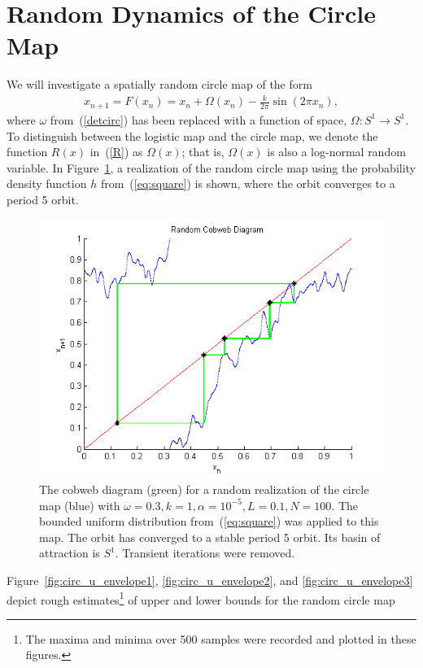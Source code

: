 \section{Random Dynamics of the Circle Map}
We will investigate a spatially random circle map of the form
\begin{align}\label{randcirc}
x_{n+1}= F(x_n) =  x_n + \Omega(x_n) - \frac{k}{2\pi}\sin(2\pi x_n),
\end{align}
where $\omega$ from~(\ref{detcirc}) has been replaced with a function
of space, $\Omega:S^1\to S^1$. To distinguish between the logistic map
and the circle map, we denote the function $R(x)$ in~(\ref{R}) as
$\Omega(x)$; that is, $\Omega(x)$ is also a log-normal random
variable. In Figure~\ref{fig:rcircstable}, a realization of the
random circle map using the probability density function $h$
from~(\ref{eq:square}) is shown, where the orbit converges to a period 5 orbit. 
\begin{figure}[!h]
\caption[Random circle map, stable orbit under the Uniform distribution]{The cobweb
  diagram (green) for a random realization of the circle map (blue) with $\omega =
  0.3, k=1, \alpha = 10^{-5},L=0.1, N=100$. The bounded uniform distribution
  from~(\ref{eq:square}) was applied to this map. The orbit
  has converged to a stable period 5 orbit. Its basin of attraction is
  $S^1$. Transient iterations were removed.}\label{fig:rcircstable}
	\begin{center}
		\includegraphics[scale=0.7]{figs/randcirc_cobweb.png}
	\end{center}
\end{figure}
Figure~\ref{fig:circ_u_envelope1}, \ref{fig:circ_u_envelope2}, and \ref{fig:circ_u_envelope3} depict rough estimates\footnote{The
  maxima and minima over 500 samples were recorded and plotted in
  these figures.} of upper and lower bounds for the random circle map
